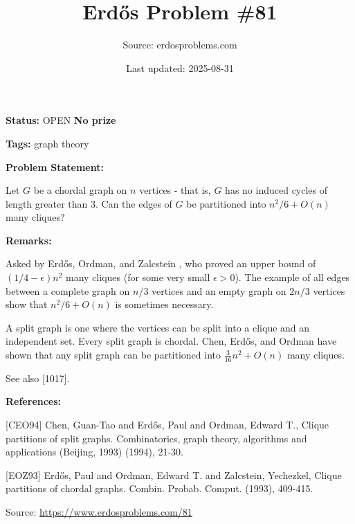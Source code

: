 \documentclass{article}
\title{Erd\H{o}s Problem \#81}
\date{Last updated: 2025-08-31}
\author{Source: erdosproblems.com}
\begin{document}
\maketitle

\noindent\textbf{Status:} OPEN \quad \textbf{No prize}

\noindent\textbf{Tags:} graph theory

\medskip
\noindent\textbf{Problem Statement:}

Let $G$ be a chordal graph on $n$ vertices - that is, $G$ has no induced cycles of length greater than $3$. Can the edges of $G$ be partitioned into $n^2/6+O(n)$ many cliques?

\bigskip
\noindent\textbf{Remarks:}

Asked by Erd\H{o}s, Ordman, and Zalcstein \cite{EOZ93}, who proved an upper bound of $(1/4-\epsilon)n^2$ many cliques (for some very small $\epsilon>0$). The example of all edges between a complete graph on $n/3$ vertices and an empty graph on $2n/3$ vertices show that $n^2/6+O(n)$ is sometimes necessary.

A split graph is one where the vertices can be split into a clique and an independent set. Every split graph is chordal. Chen, Erd\H{o}s, and Ordman \cite{CEO94} have shown that any split graph can be partitioned into $\frac{3}{16}n^2+O(n)$ many cliques.

See also [1017].

\bigskip
\noindent\textbf{References:}

[CEO94] Chen, Guan-Tao and Erd\H{o}s, Paul and Ordman, Edward T., Clique partitions of split graphs. Combinatorics, graph theory, algorithms and applications
(Beijing, 1993) (1994), 21-30.
 
 [EOZ93] Erd\H{o}s, Paul and Ordman, Edward T. and Zalcstein, Yechezkel, Clique partitions of chordal graphs. Combin. Probab. Comput. (1993), 409-415.

\bigskip
\noindent\small{Source: \url{https://www.erdosproblems.com/81}}
\end{document}
